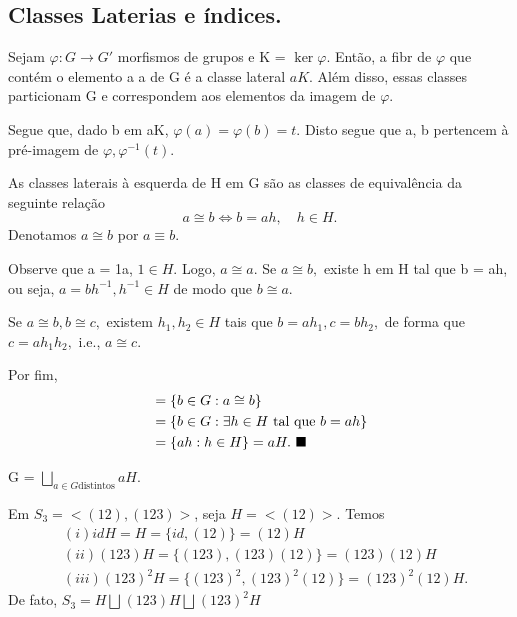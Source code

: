 \documentclass[algebra_notes.tex]{subfiles}
\begin{document}
\subsection{Classes Laterias e índices.}
\begin{prop*}
	Sejam $\varphi:G\rightarrow G'$ morfismos de grupos e K = $\ker{\varphi}$. Então, a fibr de $\varphi$ que contém o elemento a
	a de G é a classe lateral $aK$. Além disso, essas classes particionam G e correspondem aos elementos da imagem de $\varphi.$
\end{prop*}
\begin{proof*}
	Segue que, dado b em aK, $\varphi(a) = \varphi(b) = t$. Disto segue que a, b pertencem \`a pré-imagem de $\varphi, \varphi^{-1}(t).$
\end{proof*}
\begin{prop*}
	As classes laterais \`a esquerda de H em G são as classes de equivalência da seguinte relação
	$$
		a\cong{b} \Longleftrightarrow b = ah, \quad h\in H.
	$$
	Denotamos $a\cong{b}$ por $a\equiv b.$
\end{prop*}
\begin{proof*}
	Observe que a = 1a, $1\in H.$ Logo, $a\cong{a}.$ Se $a\cong{b},$ existe h em H tal que b = ah, ou seja, $a = bh^{-1}, h^{-1}\in H$
	de modo que $b\cong{a}.$

	Se $a\cong{b}, b\cong{c},$ existem $h_{1}, h_{2}\in H$ tais que $b = ah_{1}, c = bh_{2},$ de forma que $c = ah_{1}h_{2},$ i.e.,
	$a\cong{c}.$

	Por fim,
	\begin{align*}
		[a] & = \{b\in G: a\cong{b}\}                            \\
		    & = \{b\in G: \exists h\in H\text{ tal que }b = ah\} \\
		    & = \{ah: h \in H\} = aH.\text{ \qedsymbol}
	\end{align*}
\end{proof*}
\begin{crl*}
	G = $\bigsqcup_{a\in G\text{distintos}}^{}{aH}.$
\end{crl*}
\begin{example*}
	Em $S_{3} = <(12), (123)>$, seja $H = <(12)>.$ Temos
	\begin{align*}
		 & (i)id H = H = \{id, (12)\} = (12)H                               \\
		 & (ii)(123)H = \{(123), (123)(12)\} = (123)(12)H                   \\
		 & (iii)(123)^{2}H = \{(123)^{2}, (123)^{2}(12)\} = (123)^{2}(12)H.
	\end{align*}
	De fato, $S_{3} = H\bigsqcup_{}^{}{(123)H}\bigsqcup_{}^{}{(123)^{2}H}$ \qedsymbol
\end{example*}
\end{document}

